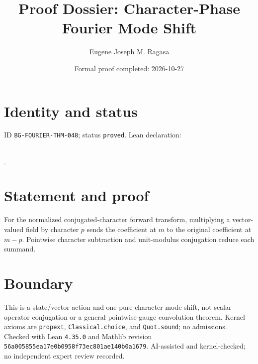 \documentclass[11pt]{article}
\title{Proof Dossier: Character-Phase Fourier Mode Shift}\author{Eugene Joseph M. Ragasa}\date{Formal proof completed: 2026-10-27}
\begin{document}
\maketitle
\section{Identity and status}
ID \texttt{BG-FOURIER-THM-048}; status \texttt{proved}. Lean declaration:
\par{}\\
{\tiny{}}.
\section{Statement and proof}
For the normalized conjugated-character forward transform, multiplying a vector-valued
field by character $p$ sends the coefficient at $m$ to the original coefficient at
$m-p$. Pointwise character subtraction and unit-modulus conjugation reduce each summand.
\section{Boundary}
This is a state/vector action and one pure-character mode shift, not scalar operator
conjugation or a general pointwise-gauge convolution theorem. Kernel axioms are
\texttt{propext}, \texttt{Classical.choice}, and \texttt{Quot.sound}; no admissions.
Checked with Lean \texttt{4.35.0} and Mathlib revision
\texttt{56a005855ea17e0b0958f73ec801ae140b0a1679}. AI-assisted and kernel-checked;
no independent expert review recorded.
\end{document}
